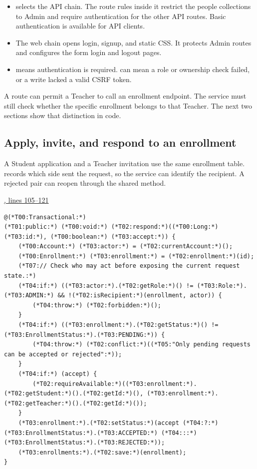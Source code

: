 \begin{itemize}
\item {} selects the API chain. The route rules
inside it restrict the people collections to Admin and require authentication for
the other API routes. Basic authentication is available for API clients.
\item The web chain opens login, signup, and static CSS. It protects Admin routes
and configures the form login and logout pages.
\item {} means authentication is required.  can mean a role or
ownership check failed, or a write lacked a valid CSRF token.
\end{itemize}

A route can permit a Teacher to call an enrollment endpoint. The service must still
check whether the specific enrollment belongs to that Teacher. The next two
sections show that distinction in code.

\clearpage
\subsection{Apply, invite, and respond to an enrollment}
A Student application and a Teacher invitation use the same enrollment table.
 records which side sent the request, so the service can identify
the recipient. A rejected pair can reopen through the shared  method.

\par\smallskip
{\small\href{\repo/blob/5d22aed7f6d4ef1e4c0b0c0dabf2962ba4b47608/src/main/java/com/example/fmschool/service/EnrollmentService.java#L105-L121}{, lines 105--121}}
\begin{lstlisting}[style=vsJava,firstnumber=105]
@(*T00:Transactional:*)
(*T01:public:*) (*T00:void:*) (*T02:respond:*)((*T00:Long:*) (*T03:id:*), (*T00:boolean:*) (*T03:accept:*)) {
    (*T00:Account:*) (*T03:actor:*) = (*T02:currentAccount:*)();
    (*T00:Enrollment:*) (*T03:enrollment:*) = (*T02:enrollment:*)(id);
    (*T07:// Check who may act before exposing the current request state.:*)
    (*T04:if:*) ((*T03:actor:*).(*T02:getRole:*)() != (*T03:Role:*).(*T03:ADMIN:*) && !(*T02:isRecipient:*)(enrollment, actor)) {
        (*T04:throw:*) (*T02:forbidden:*)();
    }
    (*T04:if:*) ((*T03:enrollment:*).(*T02:getStatus:*)() != (*T03:EnrollmentStatus:*).(*T03:PENDING:*)) {
        (*T04:throw:*) (*T02:conflict:*)((*T05:"Only pending requests can be accepted or rejected":*));
    }
    (*T04:if:*) (accept) {
        (*T02:requireAvailable:*)((*T03:enrollment:*).(*T02:getStudent:*)().(*T02:getId:*)(), (*T03:enrollment:*).(*T02:getTeacher:*)().(*T02:getId:*)());
    }
    (*T03:enrollment:*).(*T02:setStatus:*)(accept (*T04:?:*) (*T03:EnrollmentStatus:*).(*T03:ACCEPTED:*) (*T04:::*) (*T03:EnrollmentStatus:*).(*T03:REJECTED:*));
    (*T03:enrollments:*).(*T02:save:*)(enrollment);
}
\end{lstlisting}

